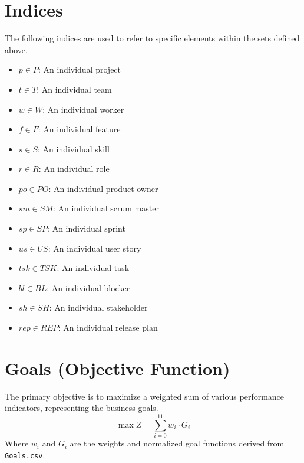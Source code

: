 \documentclass{article}
\begin{document}
\section{Indices}
The following indices are used to refer to specific elements within the sets defined above.
\begin{itemize}
    \item $p \in P$: An individual project
    \item $t \in T$: An individual team
    \item $w \in W$: An individual worker
    \item $f \in F$: An individual feature
    \item $s \in S$: An individual skill
    \item $r \in R$: An individual role
    \item $po \in PO$: An individual product owner
    \item $sm \in SM$: An individual scrum master
    \item $sp \in SP$: An individual sprint
    \item $us \in US$: An individual user story
    \item $tsk \in TSK$: An individual task
    \item $bl \in BL$: An individual blocker
    \item $sh \in SH$: An individual stakeholder
    \item $rep \in REP$: An individual release plan
\end{itemize}

\section{Goals (Objective Function)}
The primary objective is to maximize a weighted sum of various performance indicators, representing the business goals.
\begin{equation}
    \max Z = \sum_{i=0}^{11} w_i \cdot G_i
\end{equation}
Where $w_i$ and $G_i$ are the weights and normalized goal functions derived from \texttt{Goals.csv}.
\end{document}

